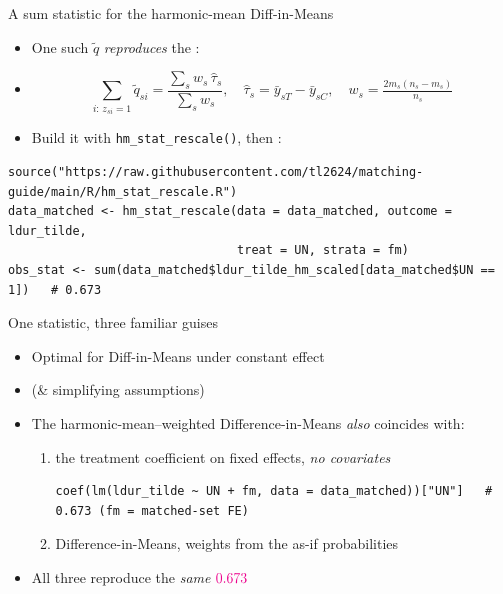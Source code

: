 \documentclass[table, xcolor = {dvipsnames}, 9pt]{beamer}
\theoremstyle{plain}
\newcommand{\mh}[1]{{\color{magenta}{#1}}}
\begin{document}
\begin{frame}[fragile, t]{A sum statistic for the harmonic-mean Diff-in-Means}
\vfill
\begin{itemize} \vfill
\item One such $\tilde{q}$ \emph{reproduces} the \mh{harmonic-mean--weighted Difference-in-Means}: \vfill
\item[]
\begin{equation*}
\sum_{i:\, z_{si}=1} \tilde{q}_{si} = \frac{\sum_s w_s\, \hat{\tau}_s}{\sum_s w_s},
\quad \hat{\tau}_s = \bar{y}_{sT} - \bar{y}_{sC},
\quad w_s = \tfrac{2 m_s (n_s - m_s)}{n_s}
\end{equation*} \vfill
\item Build it with \texttt{hm\_stat\_rescale()}, then \mh{sum over treated}: \vfill
\end{itemize}
\begin{lstlisting}[style=Rstyle, basicstyle=\ttfamily\tiny, frame=single]
source("https://raw.githubusercontent.com/tl2624/matching-guide/main/R/hm_stat_rescale.R")
data_matched <- hm_stat_rescale(data = data_matched, outcome = ldur_tilde,
                                treat = UN, strata = fm)
obs_stat <- sum(data_matched$ldur_tilde_hm_scaled[data_matched$UN == 1])   # 0.673
\end{lstlisting}
\end{frame}
\begin{frame}[fragile]{One statistic, three familiar guises}
\vfill
\begin{itemize} \vfill
\item \mh{Power:} Optimal for Diff-in-Means under constant effect \\ 
\item[] \phantom{\mh{Power:} } (\& simplifying assumptions) \vfill
\item The harmonic-mean--weighted Difference-in-Means \emph{also} coincides with: \vfill
\begin{enumerate} \vfill
\item the treatment coefficient on \mh{matched-set} fixed effects, \emph{no covariates} \\ \citep{hansenbowers2008} \vfill
\begin{lstlisting}[style=Rstyle, basicstyle=\ttfamily\tiny, frame=single]
coef(lm(ldur_tilde ~ UN + fm, data = data_matched))["UN"]   # 0.673 (fm = matched-set FE)
\end{lstlisting} \vfill
\item \mh{overlap-weighted} Difference-in-Means, weights from the as-if probabilities \\ \citep{lietal2018} \vfill
\end{enumerate} \vfill
\item All three reproduce the \emph{same} $\mh{0.673}$ \vfill
\end{itemize}
\end{frame}
\end{document}
